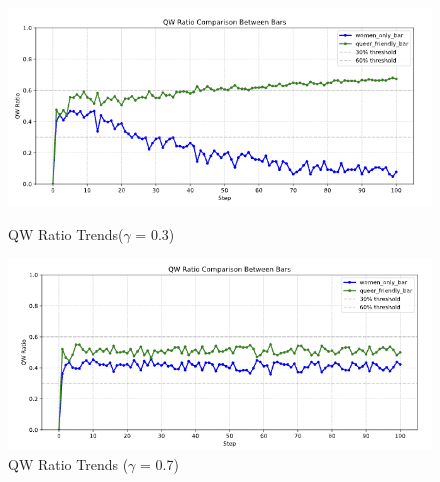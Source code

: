 \documentclass{article}
\begin{document}
\begin{figure}[H]
\centering
\begin{minipage}{0.48\textwidth}
  \centering
  \includegraphics[width=\linewidth]{figures/0.3 ratio.png}
  \caption{QW Ratio Trends($\gamma$ = 0.3)}
\end{minipage}
\hfill
\begin{minipage}{0.48\textwidth}
  \centering
  \includegraphics[width=\linewidth]{figures/0.7 ratio.png}
  \caption{QW Ratio Trends ($\gamma$ = 0.7)}
\end{minipage}
\end{figure}
\end{document}
